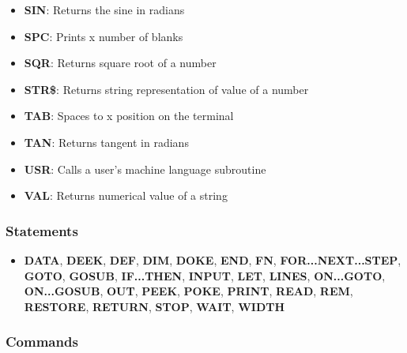 \begin{itemize}
            \item \textbf{SIN}: Returns the sine in radians
            \item \textbf{SPC}: Prints x number of blanks
            \item \textbf{SQR}: Returns square root of a number
            \item \textbf{STR\$}: Returns string representation of value of a number
            \item \textbf{TAB}: Spaces to x position on the terminal
            \item \textbf{TAN}: Returns tangent in radians
            \item \textbf{USR}: Calls a user's machine language subroutine
            \item \textbf{VAL}: Returns numerical value of a string
        \end{itemize}

        \subsubsection{Statements}

        \begin{itemize}
            \item \textbf{DATA}, \textbf{DEEK}, \textbf{DEF}, \textbf{DIM},
            \textbf{DOKE}, \textbf{END}, \textbf{FN}, \textbf{FOR...NEXT...STEP},
            \textbf{GOTO}, \textbf{GOSUB}, \textbf{IF...THEN}, \textbf{INPUT},
            \textbf{LET}, \textbf{LINES}, \textbf{ON...GOTO}, \textbf{ON...GOSUB},
            \textbf{OUT}, \textbf{PEEK}, \textbf{POKE}, \textbf{PRINT},
            \textbf{READ}, \textbf{REM}, \textbf{RESTORE}, \textbf{RETURN},
            \textbf{STOP}, \textbf{WAIT}, \textbf{WIDTH}
        \end{itemize}

        \subsubsection{Commands}

